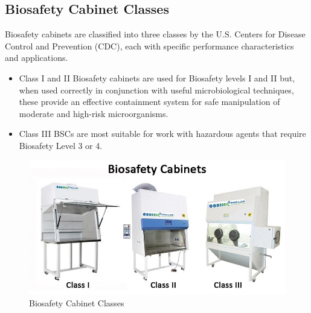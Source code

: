\documentclass{article}
\begin{document}
\subsection{Biosafety Cabinet Classes}
Biosafety cabinets are classified into three classes by the U.S. Centers for Disease Control and Prevention (CDC), each with specific performance characteristics and applications.
\begin{itemize}
\item Class I and II Biosafety cabinets are used for Biosafety levels I and II but, when used correctly in conjunction with useful microbiological techniques, these provide an effective containment system for safe manipulation of moderate and high-risk microorganisms.
\item Class III BSCs are most suitable for work with hazardous agents that require Biosafety Level 3 or 4.
\end{itemize}
\begin{figure} [h]
    \centering
    \includegraphics[scale=0.6,center]{ezgif.com-gif-maker (4).jpg}
    \caption{Biosafety Cabinet Classes}
    \label{fig:biosafety cabinet classes}
\end{figure}
\end{document}
